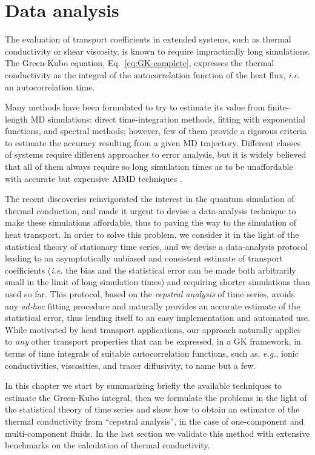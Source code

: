\chapter{Data analysis}  \label{ch:data-analysis}

\begin{LEtext}
The evaluation of transport coefficients in extended systems, such as thermal conductivity or shear viscosity, is known to require impractically long simulations. The Green-Kubo equation, Eq.~\eqref{eq:GK-complete}, expresses the thermal conductivity as the integral of the autocorrelation function of the heat flux, \emph{i.e.} an autocorrelation time. 

Many methods have been formulated to try to estimate its value from finite-length MD simulations: direct time-integration methods, fitting with exponential functions, and spectral methods; however, few of them provide a rigorous criteria to estimate the accuracy resulting from a given MD trajectory. Different classes of systems require different approaches to error analysis, but it is widely believed that all of them always require so long simulation times as to be unaffordable with accurate but expensive AIMD techniques \citep{Carbogno:2017gc}. 

The recent discoveries reinvigorated the interest in the quantum simulation of thermal conduction, and made it urgent to devise a data-analysis technique to make these simulations affordable, thus to paving the way to the \abinitio simulation of heat transport.
In order to solve this problem, we consider it in the light of the statistical theory of stationary time series, and we devise a data-analysis protocol leading to an asymptotically unbiased and consistent estimate of transport coefficients (\emph{i.e.} the bias and the statistical error can be made both arbitrarily small in the limit of long simulation times) and requiring shorter simulations than used so far. This protocol, based on the \emph{cepstral analysis} of time series, avoids any \emph{ad-hoc} fitting procedure and naturally provides an accurate estimate of the statistical error, thus lending itself to an easy implementation and automated use. 
While motivated by heat transport applications, our approach naturally applies to \emph{any} other transport properties that can be expressed, in a GK framework, in terms of time integrals of suitable autocorrelation functions, such as, \emph{e.g.}, ionic conductivities, viscosities, and tracer diffusivity, to name but a few. 

In this chapter we start by summarizing briefly the available techniques to estimate the Green-Kubo integral, then we formulate the problems in the light of the statistical theory of time series and show how to obtain an estimator of the thermal conductivity from ``cepstral analysis'', in the case of one-component and multi-component fluids. In the last section we validate this method with extensive benchmarks on the calculation of thermal conductivity.
\end{LEtext}


